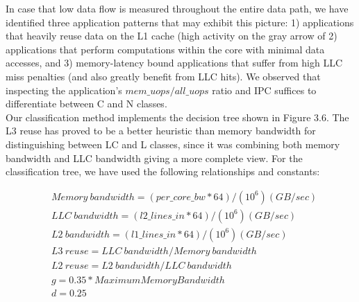 \documentclass[diploma]{Styles/softlab-thesis}
\begin{document}
In case that low data flow is measured throughout the entire data path, we have identified three application patterns that may exhibit this picture: 1) applications that heavily reuse data on the L1 cache (high activity on the gray arrow of 2) applications that perform computations within the core with minimal data accesses, and 3) memory-latency bound applications that suffer from high LLC miss penalties (and also greatly benefit from LLC hits). We observed that inspecting the application's $mem\_uops/all\_uops$ ratio and IPC suffices to differentiate between C and N classes. \\

Our classification method implements the decision tree shown in Figure 3.6. The L3 reuse has proved to be a better heuristic than memory bandwidth for distinguishing between LC and L classes, since it was combining both memory bandwidth and LLC bandwidth giving a more complete view. For the classification tree, we have used the following relationships and constants:

\begin{align*}
&Memory \ bandwidth = (per\_core\_bw*64)/(10^6) (GB/sec) \\
&LLC \ bandwidth = (l2\_lines\_in*64)/(10^6) (GB/sec) \\
&L2 \ bandwidth = (l1\_lines\_in*64)/(10^6) (GB/sec) \\
&L3 \ reuse = LLC \ bandwidth / Memory \ bandwidth \\
&L2 \ reuse = L2 \ bandwidth / LLC \ bandwidth \\
&g = 0.35 * Maximum Memory Bandwidth \\
&d = 0.25
\end{align*}
\end{document}
